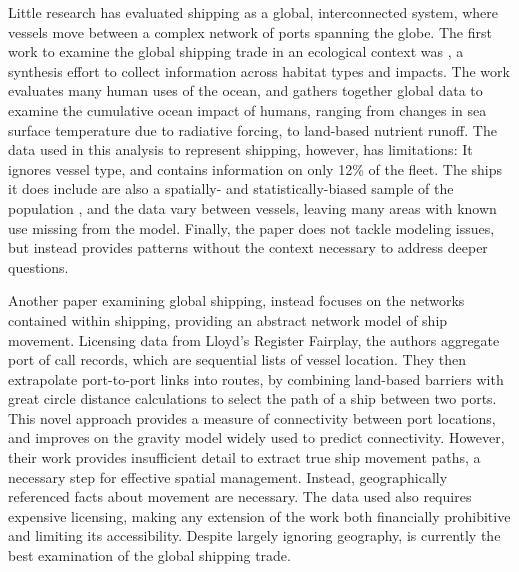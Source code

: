 Little research has evaluated shipping as a global, interconnected system, where vessels move between a complex network of ports spanning the globe. The first work to examine the global shipping trade in an ecological context was \cite{Halpern2008}, a synthesis effort to collect information across habitat types and impacts. The work evaluates many human uses of the ocean, and gathers together global data to examine the cumulative ocean impact of humans, ranging from changes in sea surface temperature due to radiative forcing, to land-based nutrient runoff. The data used in this analysis to represent shipping, however, has limitations: It ignores vessel type, %
 and contains information on only 12\% of the fleet. The ships it does include are also a spatially- and statistically-biased sample of the population \citep{Wang2007}, and the data vary between vessels, leaving many areas with known use missing from the model. Finally, the paper does not tackle modeling issues, but instead provides patterns without the context necessary to address deeper questions.

Another paper examining global shipping, \cite{Kaluza2010} instead focuses on the networks contained within shipping, providing an abstract network model of ship movement. Licensing data from Lloyd's Register Fairplay, %
 the authors aggregate port of call records, which are sequential lists of vessel location. They then extrapolate port-to-port links into routes, by combining land-based barriers with great circle distance calculations to select the path of a ship between two ports. This novel approach provides a measure of connectivity between port locations, and improves on the gravity model widely used to predict connectivity.  However, their work provides insufficient detail to extract true ship movement paths, a necessary step for effective spatial management. Instead, geographically referenced facts about movement are necessary. The data used also requires expensive licensing, making any extension of the work both financially prohibitive and limiting its accessibility. Despite largely ignoring geography, \cite{Kaluza2010} is currently the best examination of the global shipping trade.

